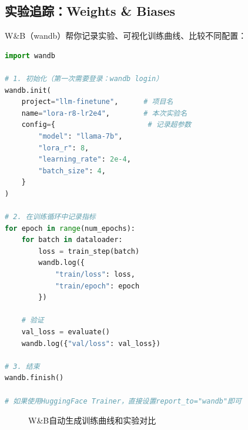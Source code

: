 \subsection*{实验追踪：Weights \& Biases}

W\&B（wandb）帮你记录实验、可视化训练曲线、比较不同配置：

\begin{lstlisting}[language=Python, caption=使用W\&B追踪实验]
import wandb

# 1. 初始化（第一次需要登录：wandb login）
wandb.init(
    project="llm-finetune",      # 项目名
    name="lora-r8-lr2e4",        # 本次实验名
    config={                      # 记录超参数
        "model": "llama-7b",
        "lora_r": 8,
        "learning_rate": 2e-4,
        "batch_size": 4,
    }
)

# 2. 在训练循环中记录指标
for epoch in range(num_epochs):
    for batch in dataloader:
        loss = train_step(batch)
        wandb.log({
            "train/loss": loss,
            "train/epoch": epoch
        })
    
    # 验证
    val_loss = evaluate()
    wandb.log({"val/loss": val_loss})

# 3. 结束
wandb.finish()

# 如果使用HuggingFace Trainer，直接设置report_to="wandb"即可
\end{lstlisting}

\begin{figure}[htbp]
\centering
{}
\caption{W\&B自动生成训练曲线和实验对比}
\end{figure}

